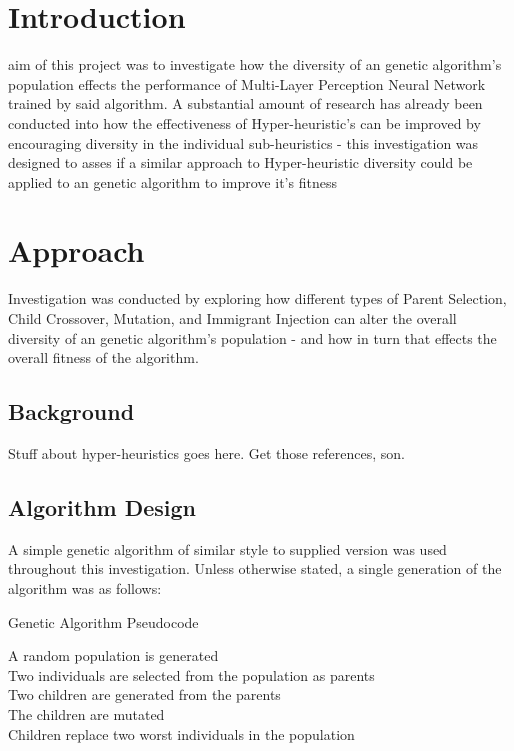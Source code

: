 
\section{Introduction}
	 aim of this project was to investigate how the diversity of an genetic algorithm's population effects the performance of Multi-Layer Perception Neural Network trained by said algorithm. 
	A substantial amount of research has already been conducted into how the effectiveness of Hyper-heuristic's can be improved by encouraging diversity in the individual sub-heuristics - this investigation was designed to asses if a similar approach to Hyper-heuristic diversity could be applied to an genetic algorithm to improve it's fitness
	
\section{Approach}
	Investigation was conducted by exploring how different types of Parent Selection, Child Crossover, Mutation, and Immigrant Injection can alter the overall diversity of an genetic algorithm's population - and how in turn that effects the overall fitness of the algorithm.
	
	\subsection{Background}
		Stuff about hyper-heuristics goes here. Get those references, son.
		\cite{Hong16112004} \cite{hart2017constructing}
	
	\subsection{Algorithm Design}
		A simple genetic algorithm of similar style to supplied version was used throughout this investigation. Unless otherwise stated, a single generation of the algorithm was as follows:

		\begin{algorithm}[H]
			\caption{Genetic Algorithm Pseudocode}
			A random population is generated\\
			Two individuals are selected from the population as parents\\
			Two children are generated from  the parents\\
			The children are mutated\\
			Children replace two worst individuals in the population
		\end{algorithm}
		
